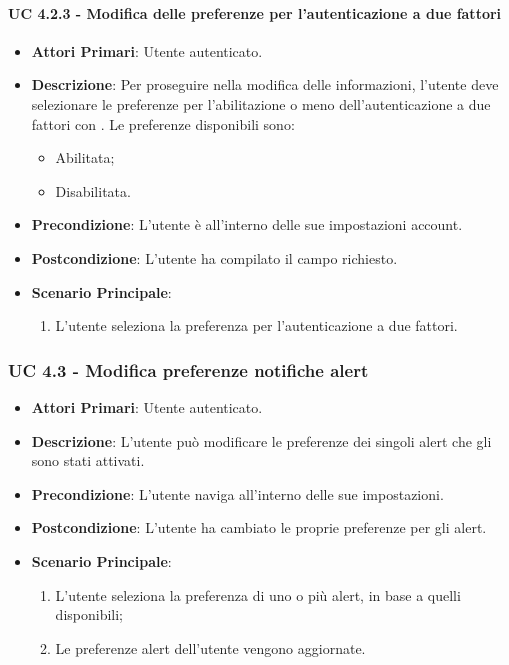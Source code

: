 				\paragraph{UC 4.2.3 - Modifica delle preferenze per l'autenticazione a due fattori}
				\begin{itemize}
					\item \textbf{Attori Primari}: Utente autenticato.
					\item \textbf{Descrizione}: Per proseguire nella modifica delle informazioni, l'utente deve selezionare le preferenze per l'abilitazione o meno dell'autenticazione a due fattori con . Le preferenze disponibili sono:
					\begin{itemize}
						\item Abilitata;
						\item Disabilitata.
					\end{itemize}
					\item \textbf{Precondizione}: L'utente è all'interno delle sue impostazioni account.
					\item \textbf{Postcondizione}: L'utente ha compilato il campo richiesto.
					\item \textbf{Scenario Principale}:
					\begin{enumerate}
						\item L'utente seleziona la preferenza per l'autenticazione a due fattori.
					\end{enumerate}
				\end{itemize}


			\subsubsection{UC 4.3 - Modifica preferenze notifiche alert}
			\begin{itemize}
				\item \textbf{Attori Primari}: Utente autenticato.
				\item \textbf{Descrizione}: L'utente può modificare le preferenze dei singoli alert che gli sono stati attivati.
				\item \textbf{Precondizione}: L'utente naviga all'interno delle sue impostazioni.
				\item \textbf{Postcondizione}: L'utente ha cambiato le proprie preferenze per gli alert.
				\item \textbf{Scenario Principale}:
				\begin{enumerate}
					\item{L'utente seleziona la preferenza di uno o più alert, in base a quelli disponibili;}
					\item{Le preferenze alert dell'utente vengono aggiornate.}
				\end{enumerate}
			\end{itemize}	

